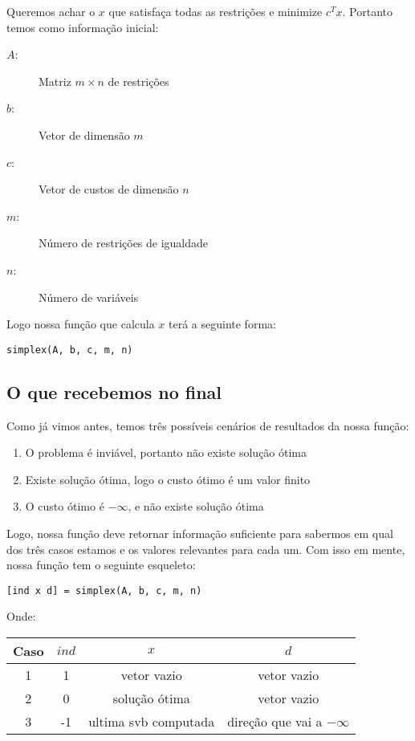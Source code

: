 \documentclass[12pt]{article}
\begin{document}
	Queremos achar o $x$ que satisfaça todas as restrições e minimize $c^Tx$. Portanto temos como informação inicial: 
	\begin{description}
		\item[$A$:] Matriz $m \times n$ de restrições
		\item[$b$:] Vetor de dimensão $m$
        \item[$c$:] Vetor de custos de dimensão $n$
        \item[$m$:] Número de restrições de igualdade
        \item[$n$:] Número de variáveis
	\end{description}

    Logo nossa função que calcula $x$ terá a seguinte forma: \\
    \begin{center}
    \texttt{simplex(A, b, c, m, n)}
    \end{center}

\subsection{O que recebemos no final}
    Como já vimos antes, temos três possíveis cenários de resultados da nossa função:
    \begin{enumerate}
        \item O problema é inviável, portanto não existe solução ótima
        \item Existe solução ótima, logo o custo ótimo é um valor finito
        \item O custo ótimo é $-\infty$, e não existe solução ótima
    \end{enumerate}
    Logo, nossa função deve retornar informação suficiente para sabermos em qual dos três casos estamos e os valores relevantes para cada um. Com isso em mente, nossa função tem o seguinte esqueleto:
    \begin{center}
        \texttt{[ind x d] = simplex(A, b, c, m, n)}
    \end{center}
    Onde:
    \begin{center}
    \begin{tabular}{ c  c  c  c }
        \textbf{Caso} & $ind$ & $x$  & $d$ \\  \hline
        1    & 1   & vetor vazio & vetor vazio \\
        2    & 0   & solução ótima & vetor vazio \\
        3    & -1  & ultima svb computada & direção que vai a $-\infty$ \\
    \end{tabular}
    \end{center}
\end{document}

